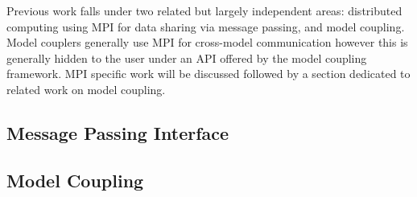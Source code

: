 Previous work falls under two related but largely independent areas: distributed
computing using MPI for data sharing via message passing, and model coupling.
Model couplers generally use MPI for cross-model communication however this is
generally hidden to the user under an API offered by the model coupling
framework. MPI specific work will be discussed followed by a section dedicated
to related work on model coupling.

\subsection{Message Passing Interface}


\subsection{Model Coupling}

